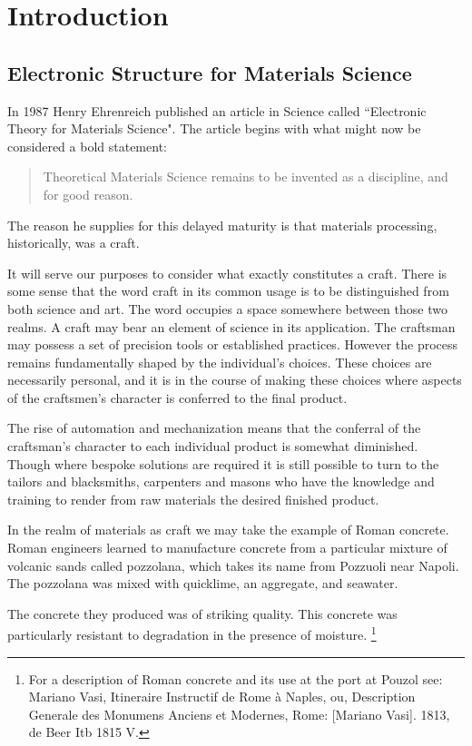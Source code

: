 \chapter{Introduction}
\section{Electronic Structure for Materials Science}
In 1987 Henry Ehrenreich published an article in Science called
``Electronic Theory for Materials Science". The article begins
with what might now be considered a bold statement:

\begin{quote}
Theoretical Materials Science remains to be invented as a discipline, and for good reason.
\end{quote}

The reason he supplies for this delayed maturity is that materials processing, 
historically, was a craft.

It will serve our purposes to consider what exactly constitutes a craft. 
There is some sense that the word craft in its common usage 
is to be distinguished from both science and art.
The word occupies a space somewhere between those two realms. 
A craft may bear an element of science in its application. 
The craftsman may possess a set of precision tools or 
established practices. However the process remains fundamentally shaped by 
the individual's choices. These choices are necessarily personal,
and it is in the course of making these choices where aspects 
of the craftsmen's character is conferred to the final product. 

The rise of automation and mechanization means that the conferral
of the craftsman's character to each individual product is 
somewhat diminished. Though where bespoke solutions are 
required it is still possible to turn to the tailors and 
blacksmiths, carpenters and masons who
have the knowledge and training to render from raw materials
the desired finished product.

In the realm of materials as craft we may take the example of Roman concrete.
%
Roman engineers learned to manufacture concrete from a 
particular mixture of volcanic sands called pozzolana, which
takes its name from Pozzuoli near Napoli. 
%
The pozzolana was mixed with quicklime, an aggregate, and seawater.

The concrete they produced was of striking quality. 
%
%
This concrete was particularly resistant to degradation in the presence of moisture.
\footnote{For a description of Roman concrete and its use at the port at Pouzol see: Mariano Vasi, 
Itineraire Instructif de Rome à Naples, ou, Description Generale des Monumens Anciens et Modernes, 
Rome: [Mariano Vasi]. 1813, de Beer Itb 1815 V.} 


